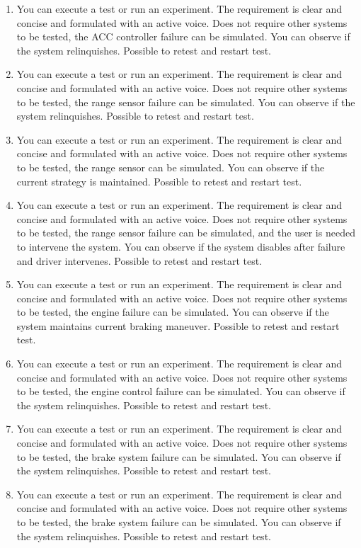 \begin{enumerate}
    \item{You can execute a test or run an experiment. The requirement is clear and concise and formulated with an active voice. Does not require other systems to be tested, the ACC controller failure can be simulated. You can observe if the system relinquishes. Possible to retest and restart test.}
    \item{You can execute a test or run an experiment. The requirement is clear and concise and formulated with an active voice. Does not require other systems to be tested, the range sensor failure can be simulated. You can observe if the system relinquishes. Possible to retest and restart test.}
    \item{You can execute a test or run an experiment. The requirement is clear and concise and formulated with an active voice. Does not require other systems to be tested, the range sensor can be simulated. You can observe if the current strategy is maintained. Possible to retest and restart test.}
    \item{You can execute a test or run an experiment. The requirement is clear and concise and formulated with an active voice. Does not require other systems to be tested, the range sensor failure can be simulated, and the user is needed to intervene the system. You can observe if the system disables after failure and driver intervenes. Possible to retest and restart test.}
    \item{You can execute a test or run an experiment. The requirement is clear and concise and formulated with an active voice. Does not require other systems to be tested, the engine failure can be simulated. You can observe if the system maintains current braking maneuver. Possible to retest and restart test.}
    \item{You can execute a test or run an experiment. The requirement is clear and concise and formulated with an active voice. Does not require other systems to be tested, the engine control failure can be simulated. You can observe if the system relinquishes. Possible to retest and restart test.}
    \item{You can execute a test or run an experiment. The requirement is clear and concise and formulated with an active voice. Does not require other systems to be tested, the brake system failure can be simulated. You can observe if the system relinquishes. Possible to retest and restart test.}
    \item{You can execute a test or run an experiment. The requirement is clear and concise and formulated with an active voice. Does not require other systems to be tested, the brake system failure can be simulated. You can observe if the system relinquishes. Possible to retest and restart test.}

\end{enumerate}
